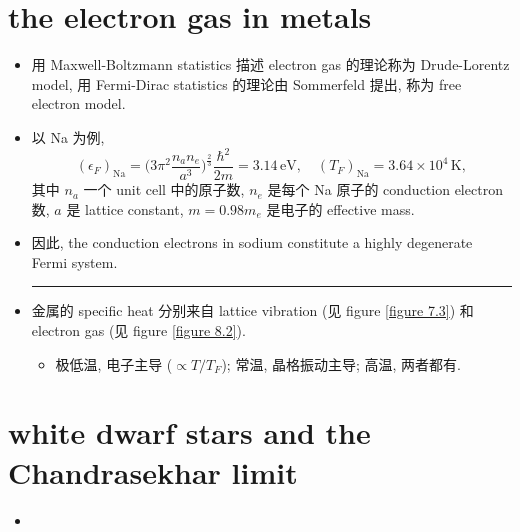 \section{the electron gas in metals}
\begin{itemize}
	\item 用 Maxwell-Boltzmann statistics 描述 electron gas 的理论称为 Drude-Lorentz model, 用 Fermi-Dirac statistics 的理论由 Sommerfeld 提出, 称为 free electron model.
	
	\item 以 Na 为例,
	\begin{equation}
		(\epsilon_F)_\text{Na} = \Big( 3 \pi^2 \frac{n_a n_e}{a^3} \Big)^{\frac{2}{3}} \frac{\hbar^2}{2 m} = 3.14 \, \text{eV}, \quad (T_F)_\text{Na} = 3.64 \times 10^4 \, \text{K},
	\end{equation}
	其中 $n_a$ 一个 unit cell 中的原子数, $n_e$ 是每个 Na 原子的 conduction electron 数, $a$ 是 lattice constant, $m = 0.98 m_e$ 是电子的 effective mass.
	
	\item 因此, the conduction electrons in sodium constitute a highly degenerate Fermi system.
	
	\noindent\rule[0.5ex]{\linewidth}{0.5pt} %
	
	\item 金属的 specific heat 分别来自 lattice vibration (见 figure \ref{figure 7.3}) 和 electron gas (见 figure \ref{figure 8.2}).
	\begin{itemize}
		\item 极低温, 电子主导 ($\propto T / T_F$); 常温, 晶格振动主导; 高温, 两者都有.
	\end{itemize}
\end{itemize}

\section{white dwarf stars and the Chandrasekhar limit}
\begin{itemize}
	\item 
\end{itemize}
